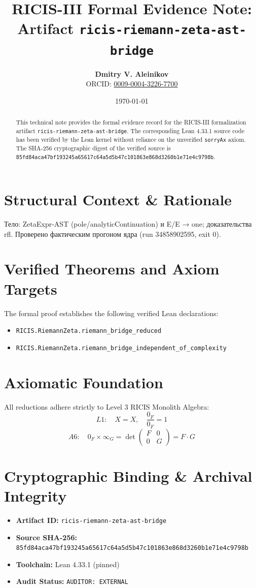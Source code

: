 \documentclass[11pt,a4paper]{article}
\title{\textbf{RICIS-III Formal Evidence Note:\\Artifact \texttt{ricis-riemann-zeta-ast-bridge}}}
\author{\textbf{Dmitry V. Aleinikov}\\ORCID: \href{https://orcid.org/0009-0004-3226-7700}{0009-0004-3226-7700}}
\date{\today}
\begin{document}
\maketitle

\begin{abstract}
This technical note provides the formal evidence record for the RICIS-III formalization artifact \texttt{ricis-riemann-zeta-ast-bridge}.
The corresponding Lean 4.33.1 source code has been verified by the Lean kernel without reliance on the unverified \texttt{sorryAx} axiom.
The SHA-256 cryptographic digest of the verified source is \texttt{85fd84aca47bf193245a65617c64a5d5b47c101863e868d3260b1e71e4c9798b}.
\end{abstract}

\section{Structural Context & Rationale}
Тело: ZetaExpr-AST (pole/analyticContinuation) и E/E → one; доказательства rfl. Проверено фактическим прогоном ядра (run 34858902595, exit 0).

\section{Verified Theorems and Axiom Targets}
The formal proof establishes the following verified Lean declarations:
\begin{itemize}
  \item \texttt{RICIS.RiemannZeta.riemann_bridge_reduced}
  \item \texttt{RICIS.RiemannZeta.riemann_bridge_independent_of_complexity}
\end{itemize}

\section{Axiomatic Foundation}
All reductions adhere strictly to Level 3 RICIS Monolith Algebra:
\begin{equation}
L1: \quad X = X, \quad \frac{0_F}{0_F} = 1
\end{equation}
\begin{equation}
A6: \quad 0_F \times \infty_G = \det\begin{pmatrix} F & 0 \\ 0 & G \end{pmatrix} = F \cdot G
\end{equation}

\section{Cryptographic Binding & Archival Integrity}
\begin{itemize}
  \item \textbf{Artifact ID:} \texttt{ricis-riemann-zeta-ast-bridge}
  \item \textbf{Source SHA-256:} \texttt{85fd84aca47bf193245a65617c64a5d5b47c101863e868d3260b1e71e4c9798b}
  \item \textbf{Toolchain:} Lean 4.33.1 (pinned)
  \item \textbf{Audit Status:} \texttt{AUDITOR: EXTERNAL}
\end{itemize}
\end{document}
